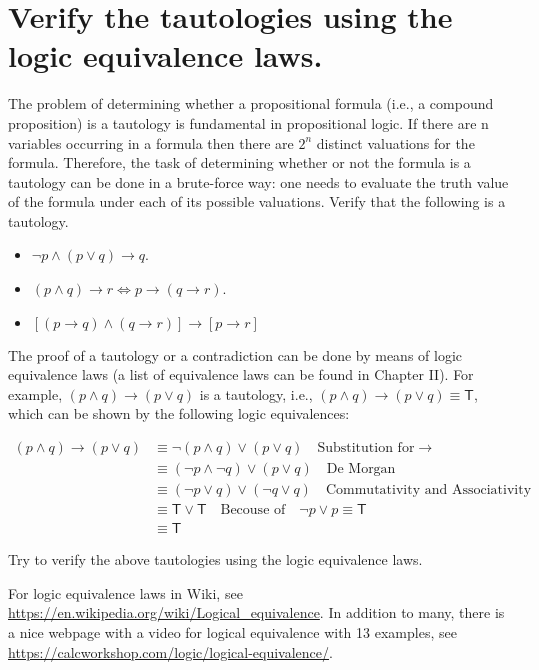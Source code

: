 \documentclass{article}
\begin{document}
\section{Verify the tautologies using the logic equivalence laws.}

The problem of determining whether a propositional formula (i.e., a compound proposition) is a tautology is fundamental in propositional logic. If there are n variables occurring in a formula then there are $2^n$ distinct valuations for the formula. Therefore, the task of determining whether or not the formula is a tautology can be done in a brute-force way: one needs to evaluate the truth value of the formula under each of its possible valuations. Verify that the following is a tautology.

\begin{itemize}
  \item $\lnot p \land (p \lor q) \to q$.
  \item $(p \land q) \to r \Leftrightarrow p \to (q \to r) $.
  \item $[(p \to q) \land (q \to r)] \to [p \to r]$
\end{itemize}

The proof of a tautology or a contradiction can be done by means of logic equivalence laws (a list of equivalence laws can be found in Chapter II). For example, $(p \land q) \to (p \lor q)$ is a tautology, i.e., $(p \land q) \to (p \lor q) \equiv \mathsf{T} $, which can be shown by the following logic equivalences:

\begin{equation*}
  \begin{aligned}
    (p \land q) \to (p \lor q) & \equiv \lnot (p \land q) \lor (p \lor q) \quad \text{Substitution for} \to \\
    & \equiv (\lnot p \land \lnot q) \lor (p \lor q) \quad \text{De Morgan} \\
    & \equiv (\lnot p \lor q) \lor (\lnot q \lor q) \quad \text{Commutativity and Associativity} \\
    & \equiv \mathsf{T} \lor \mathsf{T} \quad \text{Becouse of} \quad \lnot p \lor p \equiv \mathsf{T} \\
    & \equiv \mathsf{T}
  \end{aligned}
\end{equation*}

Try to verify the above tautologies using the logic equivalence laws.

\begin{tcolorbox}
  For logic equivalence laws in Wiki, see \url{https://en.wikipedia.org/wiki/Logical_equivalence}. In addition to many, there is a nice webpage with a video for logical equivalence with 13 examples, see \url{https://calcworkshop.com/logic/logical-equivalence/}.
\end{tcolorbox}
\end{document}
